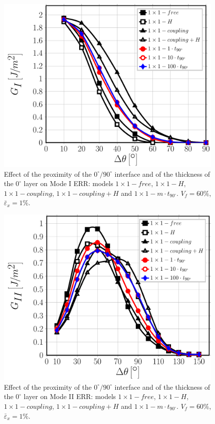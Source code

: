 \documentclass[review]{elsarticle}
\begin{document}
\begin{figure}[!htb]
\centering
\includegraphics[height=0.375\textheight]{1x1-i-vf60-GI.pdf}
\caption{Effect of the proximity of the $0^{\circ}/90^{\circ}$ interface and of the thickness of the $0^{\circ}$ layer on Mode I ERR: models $1\times 1-free$, $1\times 1-H$, $1\times 1-coupling$, $1\times 1-coupling+H$ and $1\times 1-m\cdot t_{90^{\circ}}$. $V_{f}=60\%$, $\bar{\varepsilon}_{x}=1\%$.}\label{fig:thicknessGI}
\end{figure}

\begin{figure}[!htb]
\centering
\includegraphics[height=0.375\textheight]{1x1-i-vf60-GII.pdf}
\caption{Effect of the proximity of the $0^{\circ}/90^{\circ}$ interface and of the thickness of the $0^{\circ}$ layer on Mode II ERR: models $1\times 1-free$, $1\times 1-H$, $1\times 1-coupling$, $1\times 1-coupling+H$ and $1\times 1-m\cdot t_{90^{\circ}}$. $V_{f}=60\%$, $\bar{\varepsilon}_{x}=1\%$.}\label{fig:thicknessGII}
\end{figure}
\end{document}
